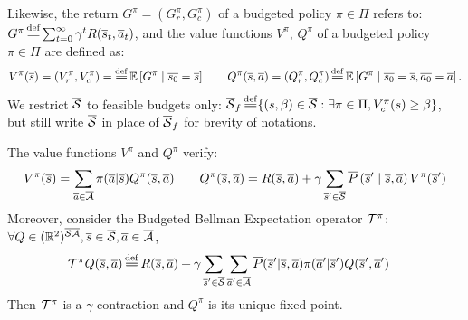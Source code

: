 \documentclass{article}
\begin{document}
Likewise, the return $G^\pi = (G_r^\pi, G_c^\pi)$ of a budgeted policy $\pi\in\Pi$ refers to:
$G^\pi \eqdef \sum_{t=0}^\infty \gamma^t R(\os_t, \oa_t)$,
and the value functions $V^\pi$, $Q^\pi$ of a budgeted policy $\pi\in\Pi$ are defined as:
\begin{equation}
    \label{eq:value-function}
V^\pi(\os) = (V_r^\pi, V_c^\pi) = \eqdef \expectedvalue\left[ G^\pi \condbar \ov{s_0} = \os\right] \qquad Q^\pi(\os, \oa)= (Q_r^\pi, Q_c^\pi) \eqdef \expectedvalue\left[ G^\pi \condbar \ov{s_0} = \os, \ov{a_0} = \oa\right].
\end{equation}
We restrict $\overline{\mathcal{S}}$ to feasible budgets only: $\ocS_f \eqdef \{(s,\beta)\in\ocS: \exists \pi\in\Pi, V_c^\pi(s) \geq \beta\}$, but still write $\overline{\mathcal{S}}$ in place of $\overline{\mathcal{S}}_f$ for brevity of notations.

\begin{proposition}
\label{prop:bellman-expectation}
The value functions $V^\pi$ and $Q^\pi$ verify:
\begin{align}
    V^\pi(\overline{s}) = \sum_{\overline{a}\in\overline{\mathcal{A}}}\pi(\overline{a} | \overline{s}) Q^\pi(\overline{s}, \overline{a}) \qquad Q^\pi(\overline{s}, \overline{a}) = R(\overline{s}, \overline{a}) + \gamma\sum_{\overline{s}'\in\overline{\mathcal{S}}}\overline{P}\left(\overline{s}' \;\middle|\; \overline{s}, \overline{a}\right) V^\pi(\overline{s}') \label{eq:bellman_expectation}
\end{align}
Moreover, consider the Budgeted Bellman Expectation operator $\mathcal{T}^\pi$:
$\forall Q\in(\mathbb{R}^2)^{\overline{\mathcal{S}}\overline{\mathcal{A}}}, \overline{s}\in\overline{\mathcal{S}}, \overline{a}\in\overline{\mathcal{A}}$,
\begin{align}
\label{eq:bellman_expectation_operator}
    \cT^\pi Q(\os, \oa) &\eqdef R(\os, \oa) + \gamma \sum_{\os'\in\ocS}\sum_{\oa'\in\ocA}\ov{P}(\os'|\os, \oa)\pi(\oa'|\os') Q(\os', \oa')
\end{align}
Then $\mathcal{T}^\pi$ is a $\gamma$-contraction and $Q^\pi$ is its unique fixed point.
\end{proposition}
\end{document}
